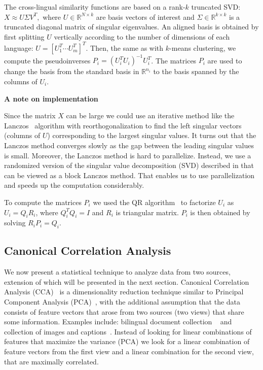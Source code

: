 \documentclass[twoside,11pt]{article}
\newcommand{\RR}{\mathbb{R}}
\begin{document}
The cross-lingual similarity functions are based on a rank-$k$ truncated SVD: $X \approx U \Sigma V^T,$ where $U \in \RR^{N \times k}$ are basis vectors of interest and $\Sigma \in \RR^{k \times k}$ is a truncated diagonal matrix of singular eigenvalues. An aligned basis is obtained by first splitting $U$ vertically according to the number of dimensions of each language: $U = [U_1^T \cdots U_m^T]^T$. Then, the same as with $k$-means clustering, we compute the pseudoinverses $P_i = (U_i^T U_i)^{-1} U_i^T$. The matrices $P_i$ are used to change the basis from the standard basis in $\RR^{n_i}$ to the basis spanned by the columns of $U_i$.

\textbf{A note on implementation}

  Since the matrix $X$ can be large we could use an iterative method like the Lanczos~\cite{golub} algorithm with reorthogonalization to find the left singular vectors (columns of $U$) corresponding to the largest singular values. It turns out that the Lanczos method converges slowly as the gap between the leading singular values is small. Moreover, the Lanczos method is hard to parallelize. Instead, we use a randomized version of the singular value decomposition (SVD) described in  that can be viewed as a block Lanczos method. That enables us to use parallelization and speeds up the computation considerably.

To compute the matrices $P_i$ we used the QR algorithm~\cite{golub} to factorize $U_i$ as $U_i = Q_i R_i$, where $Q_i^TQ_i = I$ and $R_i$ is triangular matrix. $P_i$ is then obtained by solving $R_i P_i = Q_i$.


\subsection{Canonical Correlation Analysis}\label{sec:CCA}
 We now present a statistical technique to analyze data from two sources, extension of which will be presented in the next section.
%
 Canonical Correlation Analysis (CCA)~\cite{Hotelling} is a dimensionality reduction technique similar to Principal Component Analysis (PCA)~\cite{Pearson1901On}, with the additional assumption that the data consists of feature vectors that arose from two sources (two views) that share some information. Examples include: bilingual document collection ~ and collection of images and captions~. Instead of looking for linear combinations of features that maximize the variance (PCA) we look for a linear combination of feature vectors from the first view and a linear combination for the second view, that are maximally correlated.
\end{document}
